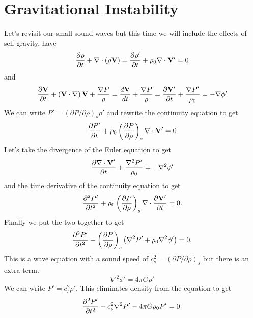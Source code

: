 \section{Gravitational Instability}
\label{sec:grav-inst}

Let's revisit our small sound waves but this time we will include the 
effects of self-gravity.
have 
\begin{equation}
\frac{\partial {\rho}}{\partial {t}} + \nabla \cdot (\rho {\bf V}) = \frac{\partial {\rho'}}{\partial {t}} + \rho_0
\nabla \cdot {\bf V}' = 0 
\label{eq:776}
\end{equation}
and 
\begin{equation}
\frac{\partial {{\bf V}}}{\partial {t}} + \left ( {\bf V} \cdot \nabla \right ) {\bf V} +
\frac{\nabla P}{\rho} =
\frac{d {\bf V}}{d {t}} + \frac{\nabla P}{\rho} =
\frac{\partial {{\bf V}'}}{\partial {t}} + \frac{\nabla P'}{\rho_0} = -\nabla \phi'
\label{eq:777}
\end{equation}
We can write $P' = (\partial P/\partial \rho)_s \rho'$ and rewrite the
continuity equation to get
\begin{equation}
\frac{\partial {P'}}{\partial {t}} + \rho_0 \left ( \frac{\partial {P}}{\partial {\rho}} \right )_s \nabla \cdot {\bf
  V'} = 0
\label{eq:778}
\end{equation}
Let's take the divergence of the Euler equation to get
\begin{equation}
\frac{\partial {{\bf \nabla \cdot V}'}}{\partial {t}} + \frac{\nabla^2 P'}{\rho_0} = -\nabla^2 \phi'
\label{eq:779}
\end{equation}
and the time derivative of the continuity equation to get
\begin{equation}
\frac{\partial {^2 P'}}{\partial {t^2}} + \rho_0 \left ( \frac{\partial {P}}{\partial {\rho}} \right )_s \nabla \cdot \frac{\partial {\bf
  V'}}{\partial {t}} = 0.
\label{eq:780}
\end{equation}
Finally we put the two together to get
\begin{equation}
\frac{\partial {^2 P'}}{\partial {t^2}} - \left ( \frac{\partial {P}}{\partial {\rho}} \right )_s \left ( \nabla^2 P'
+ \rho_0 \nabla^2 \phi' \right ) = 0.
\label{eq:781}
\end{equation}
This is a wave equation with a sound speed of $c_s^2 = (\partial
P/\partial \rho)_s$ but there is an extra term.
\begin{equation}
\nabla^2 \phi' = 4\pi G \rho'
\label{eq:782}
\end{equation}
We can write $P' = c_s^2 \rho'$.  This eliminates density from the
equation to get
\begin{equation}
\frac{\partial {^2 P'}}{\partial {t^2}} - c_s^2 \nabla^2 P' - 4\pi G \rho_0 P' = 0.
\label{eq:783}
\end{equation}
